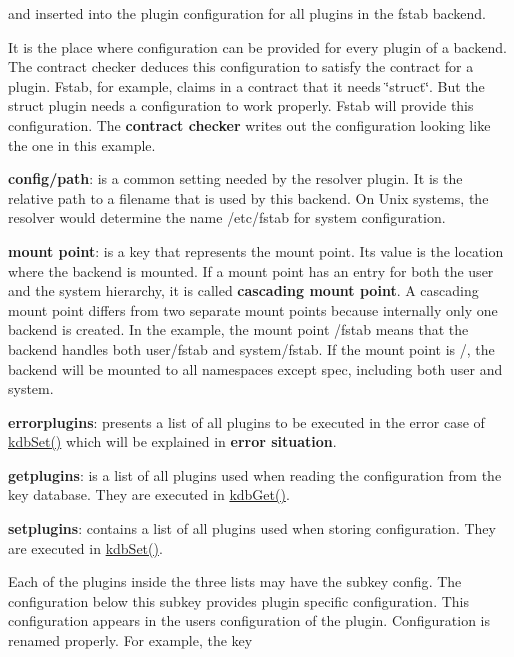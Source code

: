 and inserted into the plugin configuration for all plugins in the {\ttfamily fstab} backend.

It is the place where configuration can be provided for every plugin of a backend. The contract checker deduces this configuration to satisfy the contract for a plugin. Fstab, for example, claims in a contract that it needs \char`\"{}struct\char`\"{}. But the struct plugin needs a configuration to work properly. Fstab will provide this configuration. The {\bfseries contract checker} writes out the configuration looking like the one in this example.


\begin{DoxyItemize}
\item {\bfseries config/path}\+: is a common setting needed by the resolver plugin. It is the relative path to a filename that is used by this backend. On Unix systems, the resolver would determine the name {\ttfamily /etc/fstab} for system configuration.
\item {\bfseries mount point}\+: is a key that represents the mount point. Its value is the location where the backend is mounted. If a mount point has an entry for both the user and the system hierarchy, it is called {\bfseries cascading mount point}. A cascading mount point differs from two separate mount points because internally only one backend is created. In the example, the mount point {\ttfamily /fstab} means that the backend handles both {\ttfamily user/fstab} and {\ttfamily system/fstab}. If the mount point is {\ttfamily /}, the backend will be mounted to all namespaces except {\ttfamily spec}, including both {\ttfamily user} and {\ttfamily system}.
\item {\bfseries errorplugins}\+: presents a list of all plugins to be executed in the error case of {\ttfamily \hyperlink{group__kdb_ga11436b058408f83d303ca5e996832bcf}{kdb\+Set()}} which will be explained in {\bfseries error situation}.
\item {\bfseries getplugins}\+: is a list of all plugins used when reading the configuration from the key database. They are executed in {\ttfamily \hyperlink{group__kdb_ga28e385fd9cb7ccfe0b2f1ed2f62453a1}{kdb\+Get()}}.
\item {\bfseries setplugins}\+: contains a list of all plugins used when storing configuration. They are executed in {\ttfamily \hyperlink{group__kdb_ga11436b058408f83d303ca5e996832bcf}{kdb\+Set()}}.
\end{DoxyItemize}

Each of the plugins inside the three lists may have the subkey {\ttfamily config}. The configuration below this subkey provides plugin specific configuration. This configuration appears in the user\textquotesingle{}s configuration of the plugin. Configuration is renamed properly. For example, the key


